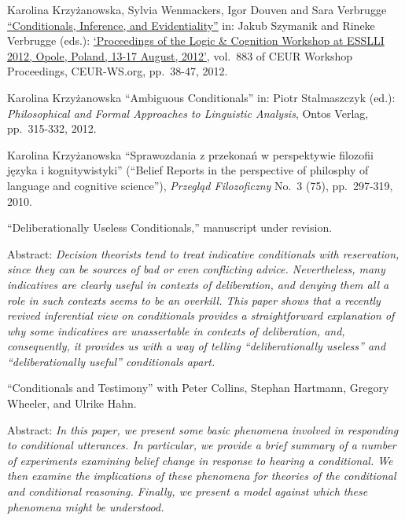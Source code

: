 \documentclass[11pt,article,oneside]{memoir}
\begin{document}
\begin{itemize}
\ind Karolina Krzyżanowska, Sylvia Wenmackers, Igor Douven and Sara Verbrugge \href{http://ceur-ws.org/Vol-883/paper4.pdf}{``Conditionals, Inference, and Evidentiality''} in: Jakub Szymanik and Rineke Verbrugge (eds.): \href{http://ceur-ws.org/Vol-883/}{`Proceedings of the Logic \& Cognition Workshop at ESSLLI 2012, Opole, Poland, 13-17 August, 2012'}, vol.~883 of CEUR Workshop Proceedings, CEUR-WS.org, pp.~38-47, 2012.

\ind Karolina Krzyżanowska ``Ambiguous Conditionals'' in: Piotr Stalmaszczyk (ed.): \emph{Philosophical and Formal Approaches to Linguistic Analysis}, Ontos Verlag, pp.~315-332, 2012.

 \ind Karolina Krzyżanowska ``Sprawozdania z przekonań w perspektywie filozofii języka i kognitywistyki'' (``Belief Reports in the perspective of philosphy of language and cognitive science''), \emph{Przegląd Filozoficzny} No.~3 (75), pp.~297-319, 2010.

\bigskip 

\ind ``Deliberationally Useless Conditionals,'' manuscript under revision.

\ind \hspace{0.35in} \footnotesize 
Abstract: \textit{Decision theorists tend to treat indicative conditionals with reservation, since they can be sources of bad or even conflicting advice. Nevertheless, many indicatives are clearly useful in contexts of deliberation, and denying them all a role in such contexts seems to be an overkill. This paper shows that a recently revived inferential view on conditionals provides a straightforward explanation of why some indicatives are unassertable in contexts of deliberation, and, consequently, it provides us with a way of telling ``deliberationally useless'' and ``deliberationally useful'' conditionals apart.}
\normalsize 
\vspace{0.05in}

\ind ``Conditionals and Testimony'' with Peter Collins, Stephan Hartmann, Gregory Wheeler, and Ulrike Hahn.

\ind \hspace{0.35in} \footnotesize 
Abstract: \textit{In this paper, we present some basic phenomena involved in responding to conditional utterances. In particular, we provide a brief summary of a number of experiments examining belief change in response to hearing a conditional. We then examine the implications of these phenomena for theories of the conditional and conditional reasoning. Finally, we present a model against which these phenomena might be understood. }
\normalsize 
\vspace{0.05in}


\end{itemize}
\end{document}
